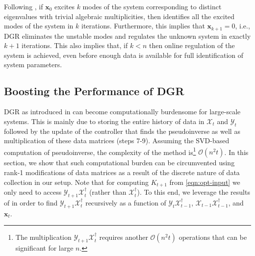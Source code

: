 \documentclass[journal]{IEEEtran}
\theoremstyle{definition}
\theoremstyle{remark}
\newcommand\x{{\bm x}}
\begin{document}
    Following , if $\x_0$ excites $k$ modes of the system corresponding to distinct eigenvalues with trivial algebraic multiplicities, then  identifies all the excited modes of the system in $k$ iterations. Furthermore, this implies that $\x_{k +1}=0$, 
    i.e., \ac{DGR} eliminates the unstable modes and regulates the unknown system in exactly $k+1$ iterations.
    {\color{PineGreen} This also implies that, if $k< n$ then online regulation of the system is achieved, even before enough data is available for full identification of system parameters.}
    

\subsection{\color{PineGreen} Boosting the Performance of \ac{DGR}}
\label{sec:complexity}

\ac{DGR} as introduced in  can become computationally burdensome for large-scale systems.
%
This is mainly due to storing the entire history of data in $\mathcal{X}_t$ and $\mathcal{Y}_t$ followed by the update of the controller that finds the pseudoinverse as well as multiplication of these data matrices (steps 7-9).
%
Assuming the \ac{SVD}-based computation of pseudoinverse, the complexity of the method is\footnote{The multiplication $\mathcal{Y}_{t+1} \mathcal{X}_t^\dagger$ requires another $\mathcal{O}(n^2t)$ operations that can be significant for large $n$.} $\mathcal{O}(n^2 t)$.
%
In this section, we show that such computational burden can be circumvented using rank-1 modifications of data matrices as a result of the discrete nature of data collection in our setup.
%
Note that for computing $K_{t+1}$  from \eqref{eqn:opt-input}
we only need to access
$\mathcal{Y}_{t+1} \mathcal{X}_t^\dagger$
(rather than $\mathcal{X}_t^\dagger$).
%
To this end, we leverage the results of \cite{Meyer1973generalized} in order to find $\mathcal{Y}_{t+1} \mathcal{X}_t^\dagger$ recursively as a function of $\mathcal{Y}_{t} \mathcal{X}_{t-1}^\dagger$, $\mathcal{X}_{t-1} \mathcal{X}_{t-1}^\dagger$, and $\x_t$.
\end{document}
